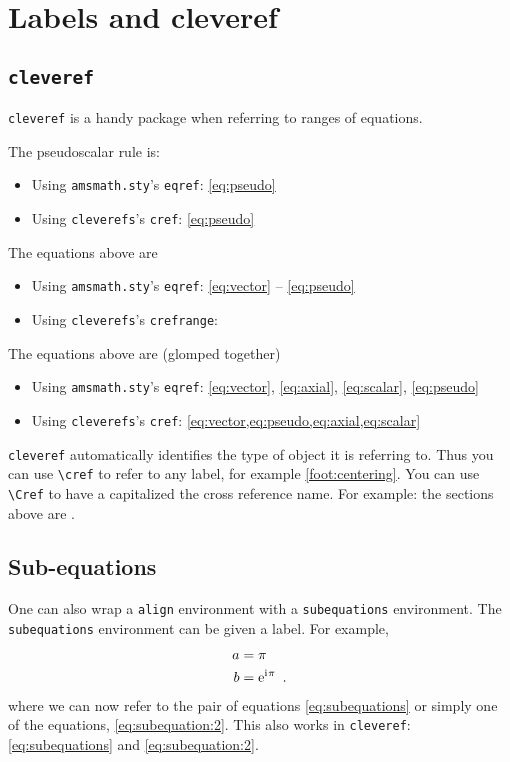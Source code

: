 \section{Labels and cleveref}
\label{sec:labels:and:cleveref}

\subsection{\texorpdfstring{\texttt{cleveref}}{cleveref}}
\label{sec:cleveref}

\texttt{cleveref} is a handy package when referring to ranges of equations. 

The pseudoscalar rule is:
\begin{itemize}
	\item Using \texttt{amsmath.sty}'s \texttt{eqref}: \eqref{eq:pseudo}
	\item Using \texttt{cleverefs}'s \texttt{cref}: \cref{eq:pseudo}
\end{itemize}

The equations above are
\begin{itemize}
	\item Using \texttt{amsmath.sty}'s \texttt{eqref}: \eqref{eq:vector} -- \eqref{eq:pseudo}
	\item Using \texttt{cleverefs}'s \texttt{crefrange}: 
\end{itemize}

The equations above are (glomped together)
\begin{itemize}
	\item Using \texttt{amsmath.sty}'s \texttt{eqref}: \eqref{eq:vector}, \eqref{eq:axial}, \eqref{eq:scalar}, \eqref{eq:pseudo}
	\item Using \texttt{cleverefs}'s \texttt{cref}: \cref{eq:vector,eq:pseudo,eq:axial,eq:scalar}
\end{itemize}

\texttt{cleveref} automatically identifies the type of object it is referring to. Thus you can use \verb!\cref! to refer to any label, for example \cref{foot:centering}. You can use \verb!\Cref! to have a capitalized the cross reference name. For example: the sections above are .


\subsection{Sub-equations}

One can also wrap a \texttt{align} environment with a \texttt{subequations} environment. The \texttt{subequations} environment can be given a label. For example,
\begin{subequations}\label{eq:subequations}
\begin{align}
	a &= \pi 
	\label{eq:subequation:1}
	\\
	b &= \operatorname{e}^{\operatorname{i}\mkern-2mu \pi} 
	\ .
	\label{eq:subequation:2}
\end{align}
\end{subequations}
where we can now refer to the pair of equations \eqref{eq:subequations} or simply one of the equations, \eqref{eq:subequation:2}. This also works in \texttt{cleveref}: \cref{eq:subequations} and \cref{eq:subequation:2}.



